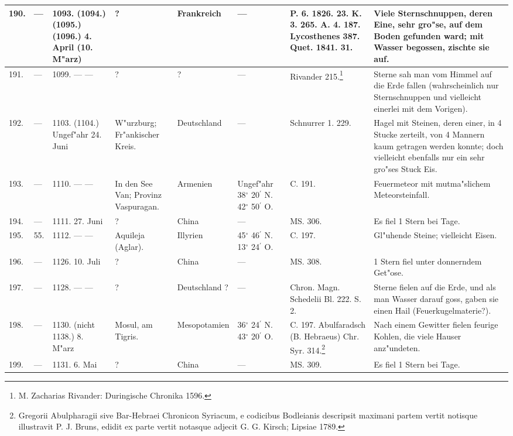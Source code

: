 \documentclass[a4paper, 8pt, oneside, polutonikogreek, german]{article}
\begin{document}
\begin{center}
\begin{longtable}{| p{5mm} | p{3mm} | p{15mm} | p{25mm} | p{20mm} | p{14mm} | p{17mm} | p{24mm} |}
        190. & --- & 1093. (1094.) (1095.) (1096.) 4. April (10. M"arz) & ? & Frankreich & --- & P. 6. 1826. 23. K. 3. 265. A. 4. 187. Lycosthenes 387. Quet. 1841. 31. & Viele Sternschnuppen, deren Eine, sehr gro"se, auf dem Boden gefunden ward; mit Wasser begossen, zischte sie auf. \\ \hline
        191. & --- & 1099. --- --- & ? & ? & --- & Rivander 215.\footnote{M. Zacharias Rivander: Duringische Chronika 1596.} & Sterne sah man vom Himmel auf die Erde fallen (wahrscheinlich nur Sternschnuppen und vielleicht einerlei mit dem Vorigen). \\ \hline
        192. & --- & 1103. (1104.) Ungef"ahr 24. Juni & W"urzburg; Fr"ankischer Kreis. & Deutschland & --- & Schnurrer 1. 229. & Hagel mit Steinen, deren einer, in 4 Stucke zerteilt, von 4 Mannern kaum getragen werden konnte; doch vielleicht ebenfalls nur ein sehr gro"ses Stuck Eis. \\ \hline
        193. & --- & 1110. --- --- & In den See Van; Provinz Vaspuragan. & Armenien & Ungef"ahr 38$^\circ$ 20$^\prime$ N. 42$^\circ$ 50$^\prime$ O. & C. 191. & Feuermeteor mit mutma"slichem Meteorsteinfall. \\ \hline
        194. & --- & 1111. 27. Juni & ? & China & --- & MS. 306. & Es fiel 1 Stern bei Tage. \\ \hline
        195. & 55. & 1112. --- --- & Aquileja (Aglar). & Illyrien & 45$^\circ$ 46$^\prime$ N. 13$^\circ$ 24$^\prime$ O. & C. 197. & Gl"uhende Steine; vielleicht Eisen. \\ \hline
        196. & --- & 1126. 10. Juli & ? & China & --- & MS. 308. & 1 Stern fiel unter donnerndem Get"ose. \\ \hline
        197. & --- & 1128. --- --- & ? & Deutschland ? & --- & Chron. Magn. Schedelii Bl. 222. S. 2. & Sterne fielen auf die Erde, und als man Wasser darauf goss, gaben sie einen Hail (Feuerkugelmaterie?). \\ \hline
        198. & --- & 1130. (nicht 1138.) 8. M"arz & Mosul, am Tigris. & Mesopotamien & 36$^\circ$ 24$^\prime$ N. 43$^\circ$ 20$^\prime$ O. & C. 197. Abulfaradsch (B. Hebraeus) Chr. Syr. 314.\footnote{Gregorii Abulpharagii sive Bar-Hebraei Chronicon Syriacum, e codicibus Bodleianis descripsit maximani partem vertit notisque illustravit P. J. Bruns, edidit ex parte vertit notasque adjecit G. G. Kirsch; Lipsiae 1789.} & Nach einem Gewitter fielen feurige Kohlen, die viele Hauser anz"undeten. \\ \hline
        199. & --- & 1131. 6. Mai & ? & China & --- & MS. 309. & Es fiel 1 Stern bei Tage. \\ \hline

\end{longtable}
\end{center}
\end{document}
